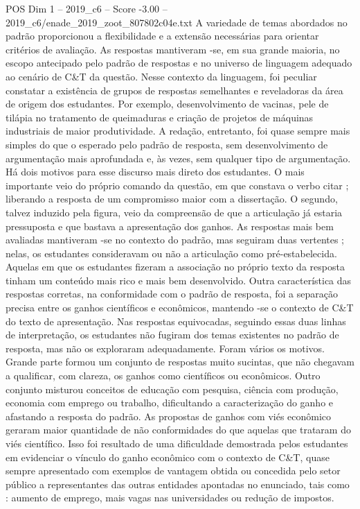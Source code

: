 \begin{textsample}{POS Dim 1 – 2019\_c6 – Score -3.00 – 2019\_c6/enade\_2019\_zoot\_807802c04e.txt}
A variedade de temas abordados no padrão proporcionou a flexibilidade e a extensão necessárias para orientar critérios de avaliação.
As respostas mantiveram -se, em sua grande maioria, no escopo antecipado pelo padrão de respostas e no universo de linguagem adequado ao cenário de C\&T da questão.
Nesse contexto da linguagem, foi peculiar constatar a existência de grupos de respostas semelhantes e reveladoras da área de origem dos estudantes.
Por exemplo, desenvolvimento de vacinas, pele de tilápia no tratamento de queimaduras e criação de projetos de máquinas industriais de maior produtividade.
A redação, entretanto, foi quase sempre mais simples do que o esperado pelo padrão de resposta, sem desenvolvimento de argumentação mais aprofundada e, às vezes, sem qualquer tipo de argumentação.
Há dois motivos para esse discurso mais direto dos estudantes.
O mais importante veio do próprio comando da questão, em que constava o verbo citar ; liberando a resposta de um compromisso maior com a dissertação.
O segundo, talvez induzido pela figura, veio da compreensão de que a articulação já estaria pressuposta e que bastava a apresentação dos ganhos.
As respostas mais bem avaliadas mantiveram -se no contexto do padrão, mas seguiram duas vertentes ; nelas, os estudantes consideravam ou não a articulação como pré-estabelecida.
Aquelas em que os estudantes fizeram a associação no próprio texto da resposta tinham um conteúdo mais rico e mais bem desenvolvido.
Outra característica das respostas corretas, na conformidade com o padrão de resposta, foi a separação precisa entre os ganhos científicos e econômicos, mantendo -se o contexto de C\&T do texto de apresentação.
Nas respostas equivocadas, seguindo essas duas linhas de interpretação, os estudantes não fugiram dos temas existentes no padrão de resposta, mas não os exploraram adequadamente.
Foram vários os motivos.
Grande parte formou um conjunto de respostas muito sucintas, que não chegavam a qualificar, com clareza, os ganhos como científicos ou econômicos.
Outro conjunto misturou conceitos de educação com pesquisa, ciência com produção, economia com emprego ou trabalho, dificultando a caracterização do ganho e afastando a resposta do padrão.
As propostas de ganhos com viés econômico geraram maior quantidade de não conformidades do que aquelas que trataram do viés científico.
Isso foi resultado de uma dificuldade demostrada pelos estudantes em evidenciar o vínculo do ganho econômico com o contexto de C\&T, quase sempre apresentado com exemplos de vantagem obtida ou concedida pelo setor público a representantes das outras entidades apontadas no enunciado, tais como : aumento de emprego, mais vagas nas universidades ou redução de impostos.

\end{textsample}
